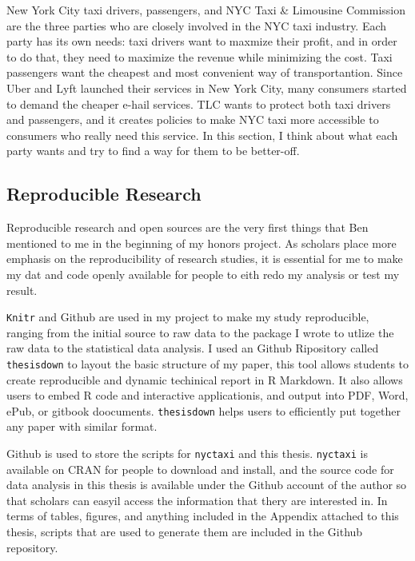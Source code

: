 \documentclass[12pt,twoside]{reedthesis}
\theoremstyle{definition}
\theoremstyle{definition}
\theoremstyle{definition}
\theoremstyle{remark}
\begin{document}
New York City taxi drivers, passengers, and NYC Taxi \& Limousine
Commission are the three parties who are closely involved in the NYC
taxi industry. Each party has its own needs: taxi drivers want to
maxmize their profit, and in order to do that, they need to maximize the
revenue while minimizing the cost. Taxi passengers want the cheapest and
most convenient way of transportantion. Since Uber and Lyft launched
their services in New York City, many consumers started to demand the
cheaper e-hail services. TLC wants to protect both taxi drivers and
passengers, and it creates policies to make NYC taxi more accessible to
consumers who really need this service. In this section, I think about
what each party wants and try to find a way for them to be better-off.

\subsection{Reproducible Research}\label{reproducible-research}

Reproducible research and open sources are the very first things that
Ben mentioned to me in the beginning of my honors project. As scholars
place more emphasis on the reproducibility of research studies, it is
essential for me to make my dat and code openly available for people to
eith redo my analysis or test my result.

\texttt{Knitr} and Github are used in my project to make my study
reproducible, ranging from the initial source to raw data to the package
I wrote to utlize the raw data to the statistical data analysis. I used
an Github Ripository called \texttt{thesisdown} to layout the basic
structure of my paper, this tool allows students to create reproducible
and dynamic techinical report in R Markdown. It also allows users to
embed R code and interactive applicationis, and output into PDF, Word,
ePub, or gitbook doocuments. \texttt{thesisdown} helps users to
efficiently put together any paper with similar format.

Github is used to store the scripts for \texttt{nyctaxi} and this
thesis. \texttt{nyctaxi} is available on CRAN for people to download and
install, and the source code for data analysis in this thesis is
available under the Github account of the author so that scholars can
easyil access the information that thery are interested in. In terms of
tables, figures, and anything included in the Appendix attached to this
thesis, scripts that are used to generate them are included in the
Github repository.
\end{document}
